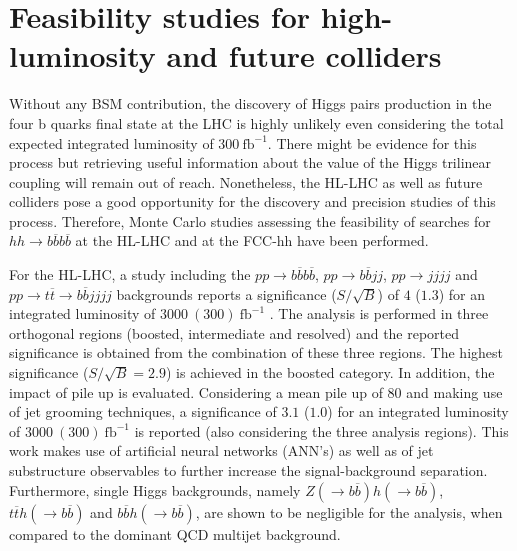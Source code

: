 \section{Feasibility studies for high-luminosity and future colliders}
\label{section:feasibility}



Without any BSM contribution, the discovery of Higgs pairs production in the four b quarks final state at the LHC is highly unlikely even considering the total expected integrated luminosity of $300~\text{fb}^{-1}$. There might be evidence for this process but retrieving useful information about the value of the Higgs trilinear coupling will remain out of reach. Nonetheless, the HL-LHC as well as future colliders pose a good opportunity for the discovery and precision studies of this process. Therefore, Monte Carlo studies assessing the feasibility of searches for $hh\rightarrow b\overline{b}b\overline{b}$ at the HL-LHC and at the FCC-hh have been performed.

For the HL-LHC, a study including the $pp\rightarrow b\overline{b}b\overline{b}$, $pp\rightarrow b\overline{b}jj$, $pp\rightarrow jjjj$ and $pp\rightarrow t\overline{t}\rightarrow b\overline{b}jjjj$ backgrounds reports a significance ($S/\sqrt{B}$) of $4$ ($1.3$) for an integrated luminosity of $3000~(300)~\text{fb}^{-1}$ \cite{hhFeasibility}. The analysis is performed in three orthogonal regions (boosted, intermediate and resolved) and the reported significance is obtained from the combination of these three regions. The highest significance ($S/\sqrt{B}=2.9$) is achieved in the boosted category. In addition, the impact of pile up is evaluated. Considering a mean pile up of 80 and making use of jet grooming techniques, a significance of $3.1$ ($1.0$) for an integrated luminosity of $3000~(300)~\text{fb}^{-1}$ is reported (also considering the three analysis regions). This work makes use of artificial neural networks (ANN's) as well as of jet substructure observables to further increase the signal-background separation. Furthermore, single Higgs backgrounds, namely $Z(\rightarrow b\overline{b})h(\rightarrow b\overline{b})$, $t\overline{t}h(\rightarrow b\overline{b})$ and $b\overline{b}h(\rightarrow b\overline{b})$, are shown to be negligible for the analysis, when compared to the dominant QCD multijet background.

